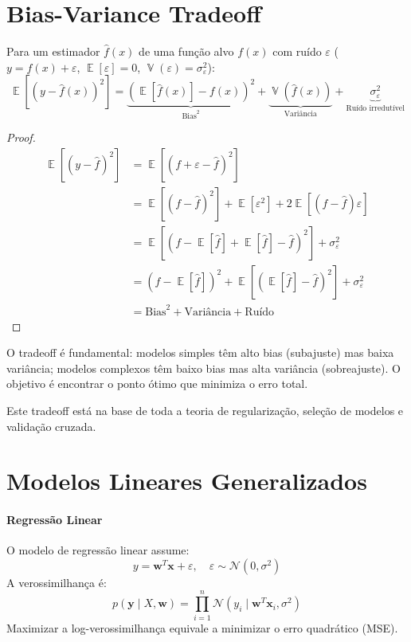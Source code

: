 \documentclass{tufte-handout}
\DeclareMathOperator{\E}{\mathbb{E}}
\DeclareMathOperator{\Var}{\mathbb{V}}
\begin{document}
\section{Bias-Variance Tradeoff}

\begin{defn}
    Para um estimador $\hat{f}(x)$ de uma função alvo $f(x)$ com ruído $\varepsilon$
    ($y = f(x) + \varepsilon$, $\E[\varepsilon] = 0$, $\Var(\varepsilon) = \sigma^2_\varepsilon$):
    \[
    \E[(y - \hat{f}(x))^2] = \underbrace{(\E[\hat{f}(x)] - f(x))^2}_{\text{Bias}^2}
    + \underbrace{\Var(\hat{f}(x))}_{\text{Variância}}
    + \underbrace{\sigma^2_\varepsilon}_{\text{Ruído irredutível}}
    \]
\end{defn}

\begin{proof}
    \begin{align*}
        \E[(y - \hat{f})^2] &= \E[(f + \varepsilon - \hat{f})^2] \\
        &= \E[(f - \hat{f})^2] + \E[\varepsilon^2] + 2\E[(f - \hat{f})\varepsilon] \\
        &= \E[(f - \E[\hat{f}] + \E[\hat{f}] - \hat{f})^2] + \sigma^2_\varepsilon \\
        &= (f - \E[\hat{f}])^2 + \E[(\E[\hat{f}] - \hat{f})^2] + \sigma^2_\varepsilon \\
        &= \text{Bias}^2 + \text{Variância} + \text{Ruído}
    \end{align*}
\end{proof}

O tradeoff é fundamental: modelos simples têm alto bias (subajuste) mas baixa variância;
modelos complexos têm baixo bias mas alta variância (sobreajuste). O objetivo é encontrar
o ponto ótimo que minimiza o erro total.

Este tradeoff está na base de toda a teoria de regularização, seleção de modelos e
validação cruzada.

\section{Modelos Lineares Generalizados}

\paragraph{Regressão Linear}

O modelo de regressão linear assume:
\[
y = \mathbf{w}^T \mathbf{x} + \varepsilon, \quad \varepsilon \sim \mathcal{N}(0, \sigma^2)
\]
A verossimilhança é:
\[
p(\mathbf{y} \mid X, \mathbf{w}) = \prod_{i=1}^n \mathcal{N}(y_i \mid \mathbf{w}^T \mathbf{x}_i, \sigma^2)
\]
Maximizar a log-verossimilhança equivale a minimizar o erro quadrático (MSE).
\end{document}
